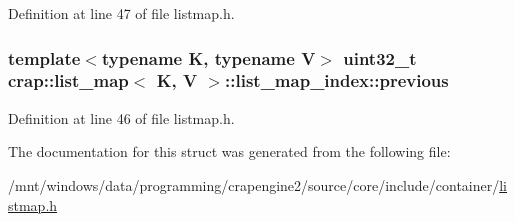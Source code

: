 Definition at line 47 of file listmap.\+h.

\hypertarget{structcrap_1_1list__map_1_1list__map__index_a8e8b7713b93e3733e4663c46e26661ac}{
\subsubsection[{previous}]{\setlength{\rightskip}{0pt plus 5cm}template$<$typename K, typename V$>$ uint32\+\_\+t {\bf crap\+::list\+\_\+map}$<$ K, V $>$\+::list\+\_\+map\+\_\+index\+::previous}}\label{structcrap_1_1list__map_1_1list__map__index_a8e8b7713b93e3733e4663c46e26661ac}


Definition at line 46 of file listmap.\+h.



The documentation for this struct was generated from the following file\+:\begin{DoxyCompactItemize}
\item 
/mnt/windows/data/programming/crapengine2/source/core/include/container/\hyperlink{listmap_8h}{listmap.\+h}\end{DoxyCompactItemize}
